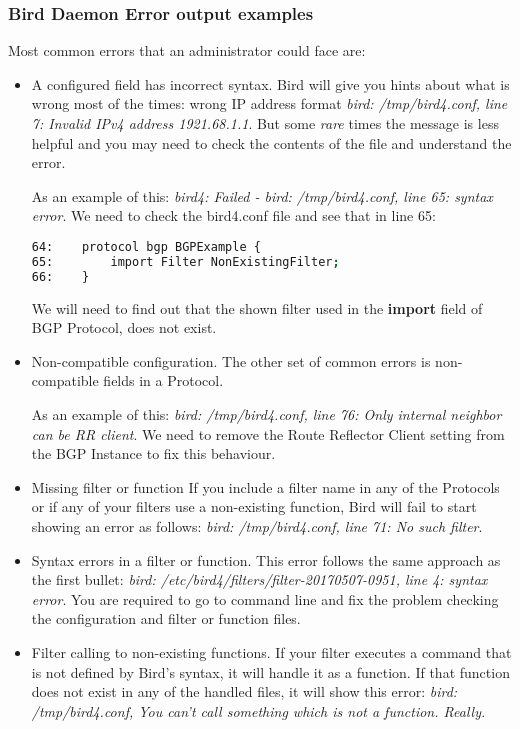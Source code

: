 \subsubsection{Bird Daemon Error output examples}
Most common errors that an administrator could face are:

\begin{itemize}
\item A configured field has incorrect syntax.
Bird will give you hints about what is wrong most of the times: wrong IP address format \textit{bird: /tmp/bird4.conf, line 7: Invalid IPv4 address 1921.68.1.1}. But some \textit{rare} times the message is less helpful and you may need to check the contents of the file and understand the error.

As an example of this: \textit{bird4: Failed - bird: /tmp/bird4.conf, line 65: syntax error}. We need to check the bird4.conf file and see that in line 65:

\begin{lstlisting}[language=bash, caption={Bird4.conf contents}]
64:    protocol bgp BGPExample {
65:        import Filter NonExistingFilter;
66:    }
\end{lstlisting}

We will need to find out that the shown filter used in the \textbf{import} field of BGP Protocol, does not exist.

\item Non-compatible configuration.
The other set of common errors is non-compatible fields in a Protocol.

As an example of this: \textit{bird: /tmp/bird4.conf, line 76: Only internal neighbor can be RR client}. We need to remove the Route Reflector Client setting from the BGP Instance to fix this behaviour.

\item Missing filter or function
If you include a filter name in any of the Protocols or if any of your filters use a non-existing function, Bird will fail to start showing an error as follows: \textit{bird: /tmp/bird4.conf, line 71: No such filter}.

\item Syntax errors in a filter or function.
This error follows the same approach as the first bullet: \textit{bird: /etc/bird4/filters/filter-20170507-0951, line 4: syntax error}. You are required to go to command line and fix the problem checking the configuration and filter or function files.

\item Filter calling to non-existing functions.
If your filter executes a command that is not defined by Bird's syntax, it will handle it as a function. If that function does not exist in any of the handled files, it will show this error: \textit{bird: /tmp/bird4.conf, You can't call something which is not a function. Really.}


\end{itemize}
